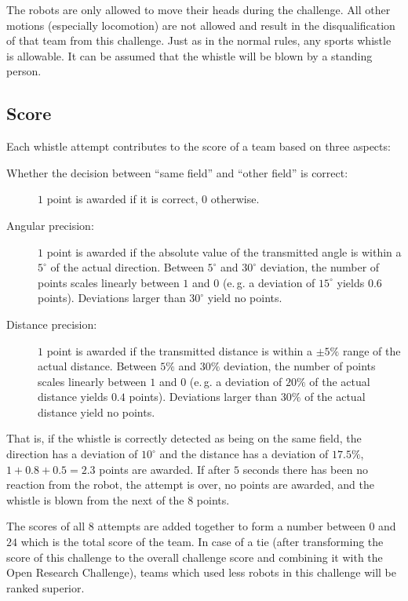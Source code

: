 \documentclass[12pt]{article}
\newcommand{\eg}{\mbox{e.\,g.}\xspace}
\begin{document}
The robots are only allowed to move their heads during the challenge. All other motions (especially locomotion) are not allowed and result in the disqualification of that team from this challenge. Just as in the normal rules, any sports whistle is allowable. It can be assumed that the whistle will be blown by a standing person.

\subsection{Score}
\label{sec:dwc:score}
Each whistle attempt contributes to the score of a team based on three aspects:
\begin{description}
\item[Whether the decision between ``same field'' and ``other field'' is correct:] \(1\) point is awarded if it is correct, \(0\) otherwise.
\item[Angular precision:] \(1\) point is awarded if the absolute value of the transmitted angle is within a \(5^\circ\) of the actual direction. Between \(5^\circ\) and \(30^\circ\) deviation, the number of points scales linearly between \(1\) and \(0\) (\eg a deviation of \(15^\circ\) yields \(0.6\) points). Deviations larger than \(30^\circ\) yield no points.
\item[Distance precision:] \(1\) point is awarded if the transmitted distance is within a \(\pm5\%\) range of the actual distance. Between \(5\%\) and \(30\%\) deviation, the number of points scales linearly between \(1\) and \(0\) (\eg a deviation of \(20\%\) of the actual distance yields \(0.4\) points). Deviations larger than \(30\%\) of the actual distance yield no points.
\end{description}
That is, if the whistle is correctly detected as being on the same field, the direction has a deviation of \(10^\circ\) and the distance has a deviation of \(17.5\%\), \(1+0.8+0.5=2.3\) points are awarded. If after \(5\) seconds there has been no reaction from the robot, the attempt is over, no points are awarded, and the whistle is blown from the next of the \(8\) points.

The scores of all \(8\) attempts are added together to form a number between \(0\) and \(24\) which is the total score of the team. In case of a tie (after transforming the score of this challenge to the overall challenge score and combining it with the Open Research Challenge), teams which used less robots in this challenge will be ranked superior.
\end{document}
